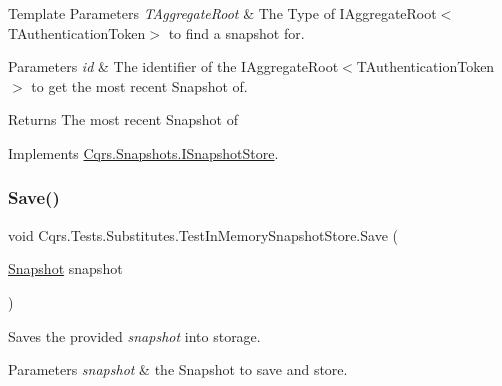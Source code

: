 \begin{DoxyTemplParams}{Template Parameters}
{\em T\+Aggregate\+Root} & The Type of I\+Aggregate\+Root$<$\+T\+Authentication\+Token$>$ to find a snapshot for.\\
\hline
\end{DoxyTemplParams}

\begin{DoxyParams}{Parameters}
{\em id} & The identifier of the I\+Aggregate\+Root$<$\+T\+Authentication\+Token$>$ to get the most recent Snapshot of.\\
\hline
\end{DoxyParams}
\begin{DoxyReturn}{Returns}
The most recent Snapshot of
\end{DoxyReturn}


Implements \hyperlink{interfaceCqrs_1_1Snapshots_1_1ISnapshotStore_ab7bd163fc9cd5c3bd5911679030be403_ab7bd163fc9cd5c3bd5911679030be403}{Cqrs.\+Snapshots.\+I\+Snapshot\+Store}.

\mbox{\label{classCqrs_1_1Tests_1_1Substitutes_1_1TestInMemorySnapshotStore_afec5ba3ed2b39625b3ccfb002d1c935e_afec5ba3ed2b39625b3ccfb002d1c935e}} 
\subsubsection{\texorpdfstring{Save()}{Save()}}
{\footnotesize\ttfamily void Cqrs.\+Tests.\+Substitutes.\+Test\+In\+Memory\+Snapshot\+Store.\+Save (\begin{DoxyParamCaption}\item[{\hyperlink{classCqrs_1_1Snapshots_1_1Snapshot}{Snapshot}}]{snapshot }\end{DoxyParamCaption})}



Saves the provided {\itshape snapshot}  into storage. 


\begin{DoxyParams}{Parameters}
{\em snapshot} & the Snapshot to save and store.\\
\hline
\end{DoxyParams}


